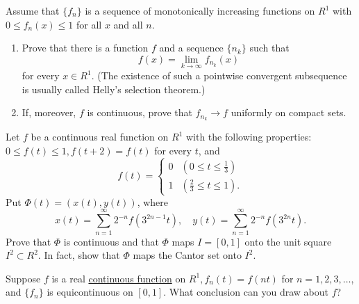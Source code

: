   \begin{exercise}[Rudin 7.13]
    Assume that $\{f_n\}$ is a sequence of monotonically increasing functions on $R^1$ with $0 \le f_n(x) \le 1$ for all $x$ and all $n$.
    \begin{enumerate}
      \item[(a)] Prove that there is a function $f$ and a sequence $\{n_k\}$ such that
        \begin{equation}
          f(x) = \lim_{k \to \infty} f_{n_k}(x)
        \end{equation}
        for every $x \in R^1$. (The existence of such a pointwise convergent subsequence is usually called Helly's selection theorem.)
      \item[(b)] If, moreover, $f$ is continuous, prove that $f_{n_k} \to f$ uniformly on compact sets.
    \end{enumerate}
  \end{exercise}
  \begin{solution}

  \end{solution}

  \begin{exercise}[Rudin 7.14]
    Let $f$ be a continuous real function on $R^1$ with the following properties: $0 \le f(t) \le 1, f(t + 2) = f(t)$ for every $t$, and
    \begin{equation}
      f(t) = 
      \begin{cases}
        0 & (0 \le t \le \frac{1}{3}) \\
        1 & (\frac{2}{3} \le t \le 1).
      \end{cases}
    \end{equation}
    Put $\Phi(t) = (x(t), y(t))$, where
    \begin{equation}
      x(t) = \sum_{n=1}^\infty 2^{-n} f(3^{2n-1}t), \quad y(t) = \sum_{n=1}^\infty 2^{-n} f(3^{2n}t).
    \end{equation}
    Prove that $\Phi$ is continuous and that $\Phi$ maps $I = [0, 1]$ onto the unit square $I^2 \subset R^2$. In fact, show that $\Phi$ maps the Cantor set onto $I^2$.
  \end{exercise}
  \begin{solution}

  \end{solution}

  \begin{exercise}[Rudin 7.15]
    Suppose $f$ is a real \hyperref[pst-def:continuous_func]{continuous function} on $R^1, f_n(t) = f(nt)$ for $n = 1, 2, 3, \dots$, and $\{f_n\}$ is equicontinuous on $[0, 1]$. What conclusion can you draw about $f$?
  \end{exercise}
  \begin{solution}

  \end{solution}


